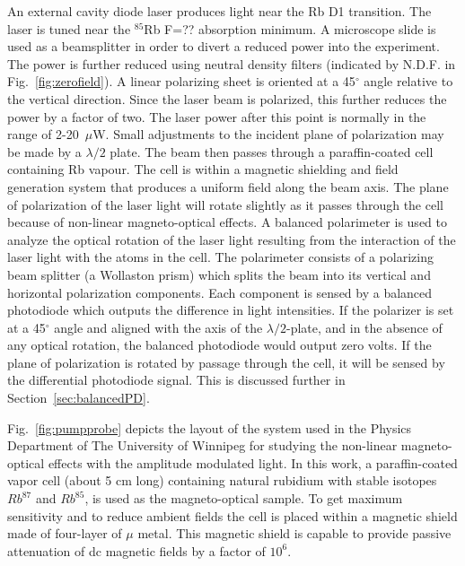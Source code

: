 An external cavity diode laser produces light near the Rb D1
transition.  The laser is tuned near the $^{85}$Rb F=?? absorption
minimum.  A microscope slide is used as a beamsplitter in order to
divert a reduced power into the experiment.  The power is further
reduced using neutral density filters (indicated by N.D.F. in
Fig.~\ref{fig:zerofield}).  A linear polarizing sheet is oriented at a
45$^\circ$ angle relative to the vertical direction.  Since the laser
beam is polarized, this further reduces the power by a factor of two.
The laser power after this point is normally in the range of
2-20~$\mu$W.  Small adjustments to the incident plane of polarization
may be made by a $\lambda/2$ plate.  The beam then passes through a
paraffin-coated cell containing Rb vapour.  The cell is within a
magnetic shielding and field generation system that produces a uniform
field along the beam axis.  The plane of polarization of the laser
light will rotate slightly as it passes through the cell because of
non-linear magneto-optical effects.  A balanced polarimeter is used to
analyze the optical rotation of the laser light resulting from the
interaction of the laser light with the atoms in the cell.  The
polarimeter consists of a polarizing beam splitter (a Wollaston prism)
which splits the beam into its vertical and horizontal polarization
components.  Each component is sensed by a balanced photodiode which
outputs the difference in light intensities.  If the polarizer is set
at a 45$^\circ$ angle and aligned with the axis of the
$\lambda/2$-plate, and in the absence of any optical rotation, the
balanced photodiode would output zero volts.  If the plane of
polarization is rotated by passage through the cell, it will be sensed
by the differential photodiode signal.  This is discussed further in
Section~\ref{sec:balancedPD}.


Fig.~\ref{fig:pumpprobe} depicts the layout of the system used in the
Physics Department of The University of Winnipeg for studying the
non-linear magneto-optical effects with the amplitude modulated
light. In this work, a paraffin-coated vapor cell (about 5 cm long)
containing natural rubidium with stable isotopes $Rb^{87}$ and
$Rb^{85}$, is used as the magneto-optical sample. To get maximum
sensitivity and to reduce ambient fields the cell is placed within a
magnetic shield made of four-layer of $\mu$ metal. This magnetic
shield is capable to provide passive attenuation of dc magnetic fields
by a factor of $10^6$.

